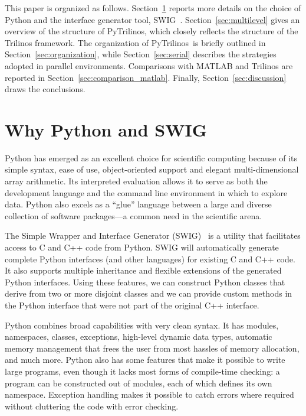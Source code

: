 \documentclass{llncs}
\newcommand{\PyTrilinos}{{\sc PyTrilinos}}
\begin{document}
\smallskip

This paper is organized as follows. Section~\ref{sec:why} reports more details
on the choice of Python and the interface generator tool, SWIG~\cite{swig}.
Section~\ref{sec:multilevel} gives an overview of the structure of \PyTrilinos,
which closely reflects the structure of the Trilinos framework. The
organization of \PyTrilinos\ is briefly outlined in
Section~\ref{sec:organization}, while Section~\ref{sec:serial} describes the
strategies adopted in parallel environments. Comparisons with MATLAB and
Trilinos are reported in Section~\ref{sec:comparison_matlab}. Finally,
Section~\ref{sec:discussion} draws the conclusions.

\section{Why Python and SWIG}
\label{sec:why}

Python has emerged as an excellent choice for scientific computing
because of its simple syntax, ease of use, object-oriented support and
elegant multi-dimensional array arithmetic.  Its interpreted
evaluation allows it to serve as both the development language and the
command line environment in which to explore data.  Python also excels
as a ``glue'' language between a large and diverse collection of
software packages---a common need in the scientific arena.

The Simple Wrapper and Interface Generator (SWIG)~\cite{swig} is a
utility that facilitates access to C and C++ code from Python. SWIG
will automatically generate complete Python interfaces (and other
languages) for existing C and C++ code.  It also supports multiple
inheritance and flexible extensions of the generated Python
interfaces.  Using these features, we can construct Python classes
that derive from two or more disjoint classes and we can provide
custom methods in the Python interface that were not part of the
original C++ interface.

Python combines broad capabilities with very clean syntax.  It has
modules, namespaces, classes, exceptions, high-level dynamic data
types, automatic memory management that frees the user from most
hassles of memory allocation, and much more.  Python also has some
features that make it possible to write large programs, even though
it lacks most forms of compile-time checking: a program can be
constructed out of modules, each of which defines its own namespace.
Exception handling makes it possible to catch errors where required
without cluttering the code with error checking.
\end{document}
